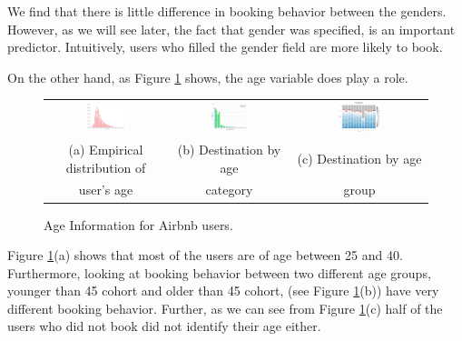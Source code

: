 \documentclass[12pt]{article}
\begin{document}
We find that there is little difference in booking behavior between the genders. However, as we will see later, the fact that gender was specified, is an important predictor. Intuitively, users who filled the gender field are more likely to book. 

On the other hand, as Figure \ref{fig:airbnb_age} shows, the age variable does play a role.

\begin{figure}[H]
	\begin{tabular}{ccc}
		\includegraphics[width=0.33\textwidth]{age} & \includegraphics[width=0.33\textwidth]{age_category_country} & \includegraphics[width=0.33\textwidth]{age_country}\\
		(a) Empirical distribution of & (b) Destination by age & (c) Destination by age \\
		user's age & category & group
	\end{tabular}
	\caption{Age Information for Airbnb users. }
	\label{fig:airbnb_age}
\end{figure}

Figure \ref{fig:airbnb_age}(a) shows that most of the users are of age between 25 and 40. Furthermore, looking at booking behavior between two different age groups, younger than 45 cohort and older than 45 cohort, (see Figure \ref{fig:airbnb_age}(b)) have very different booking behavior. Further, as we can see from Figure \ref{fig:airbnb_age}(c) half of the users who did not book did not identify their age either. 
\end{document}
